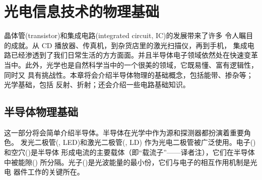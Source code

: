 \chapter{光电信息技术的物理基础}
\par 晶体管(transistor)和集成电路(integrated circuit, IC)的发展带来了许多
令人瞩目的成就。从 CD 播放器、传真机，到杂货店里的激光扫描仪，再到手机，
集成电路已经渗透到了我们日常生活的方方面面。并且半导体电子领域依然处在快速变革
当中。此外，光学也是自然科学当中的一个很美的领域，它既易懂、富有逻辑性，同时又
具有挑战性。本章将会介绍半导体物理的基础概念，包括能带、掺杂等；光学基础，包括
反射、折射；还会介绍一些电路基础知识。

\section{半导体物理基础}
\par 这一部分将会简单介绍半导体。半导体在光学中作为源和探测器都扮演着重要角色。
发光二极管(, LED)和激光二极管(, LD)
作为光电二极管被广泛使用。电子()和空穴()是半导体
形成电流的主要载体（即“载流子”——译者注），它们在半导体中被能隙()
所分隔。光子()是光波能量的最小份，它们与电子的相互作用机制是光电
器件工作的关键所在。

